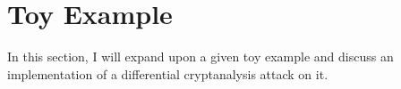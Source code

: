 



\chapter{Toy Example} \label{c:toy example}

In this section, I will expand upon a given toy example and discuss
an implementation of a differential cryptanalysis attack on it.
